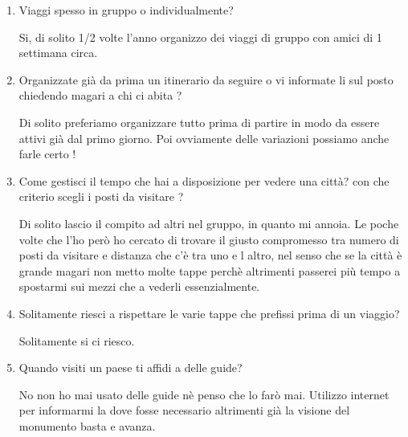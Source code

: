 

\begin{enumerate}

\item Viaggi spesso in gruppo o individualmente?

Si, di solito 1/2 volte l'anno organizzo dei viaggi di gruppo con amici di 1 settimana circa.

\item Organizzate già da prima un itinerario da seguire o vi informate li sul posto chiedendo magari a chi ci abita ?

Di solito preferiamo organizzare tutto prima di partire in modo da essere attivi già dal primo giorno. Poi ovviamente delle variazioni possiamo anche farle certo !

\item Come gestisci il tempo che hai a disposizione per vedere una città? con che criterio scegli i posti da visitare ?

Di solito lascio il compito ad altri nel gruppo, in quanto mi annoia. Le poche volte che l'ho però ho cercato di trovare il giusto compromesso tra numero di posti da visitare e distanza che c'è tra uno e l altro, nel senso che se la città è grande magari non metto molte tappe perchè altrimenti passerei più tempo a spostarmi sui mezzi che a vederli essenzialmente.

\item Solitamente riesci a rispettare le varie tappe che prefissi prima di un viaggio?

Solitamente si ci riesco.

\item Quando visiti un paese ti affidi a delle guide?

No non ho mai usato delle guide nè penso che lo farò mai. Utilizzo internet per informarmi la dove fosse necessario altrimenti già la visione del monumento basta e avanza.

\end{enumerate}

\clearpage
{}

